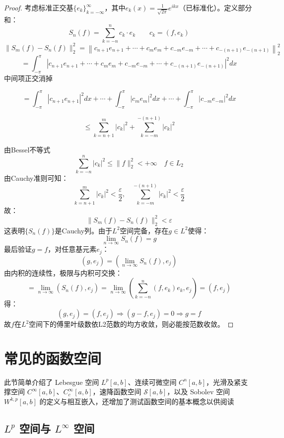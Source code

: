 \documentclass[linespread=1.5,openany]{book}%
\theoremstyle{plain}
\begin{document}
{{{{{{{{\begin{proof}
											考虑标准正交基$\{e_k\}_{k=-\infty}^\infty$，其中$e_k(x) = \frac{1}{\sqrt{2\pi}}e^{ikx}$（已标准化）。定义部分和：
											\[	S_n(f) = \sum_{k=-n}^n c_k \cdot e_k \quad \quad c_k = (f, e_k)\]
											\[	\| S_m(f) - S_n(f) \|_2^2 = \left\| c_{n+1} e_{n+1} + \cdots + c_m e_m + c_{-m} e_{-m} + \cdots + c_{-(n+1)} e_{-(n+1)} \right\|_2^2\]
											\[
											= \int_{-\pi}^\pi \left| c_{n+1} e_{n+1} + \cdots + c_m e_m + c_{-m} e_{-m} + \cdots + c_{-(n+1)} e_{-(n+1)} \right|^2 dx
											\]
											中间项正交消掉
											
											\[
											= \int_{-\pi}^\pi |c_{n+1} e_{n+1}|^2 dx + \cdots + \int_{-\pi}^\pi |c_m e_m|^2 dx + \cdots + \int_{-\pi}^\pi |c_{-m} e_{-m}|^2 dx
											\]
											
											\[
											\leq \sum_{k=n+1}^m  |c_k|^2 + \sum_{k=-m}^{-(n+1)} |c_k|^2
											\]
											
											由Bessel不等式
											\[
											\sum_{k=-n}^n |c_k|^2 \leq \|f\|_2^2 < +\infty \quad f \in L_2
											\]
											由Cauchy准则可知：
											\[
											\sum_{k=n+1}^m |c_k|^2 < \frac{\varepsilon}{2}, \quad \sum_{k=-m}^{-(n+1)} |c_k|^2 < \frac{\varepsilon}{2}
											\]
											故：
											\[\| S_m(f) - S_n(f) \|_2^2 < \varepsilon \]
											这表明$\{S_n(f)\}$是Cauchy列。由于$L^2$空间完备，存在$g \in L^2$使得：
											\[\lim_{n \to \infty} S_n(f) = g\]
											最后验证$g = f$，对任意基元素$e_j$：
											\[(g, e_j) = \left( \lim_{n \to \infty} S_n(f), e_j \right)\]
											由内积的连续性，极限与内积可交换：
											\[= \lim_{n \to \infty} (S_n(f), e_j) = \lim_{n \to \infty} \left( \sum_{k=-n}^n (f, e_k) e_k, e_j \right) = (f, e_j)
											\]
											得：
											\[
											(g, e_j) = (f, e_j) \Rightarrow (g - f, e_j) = 0 \Rightarrow g = f
											\]
											故$f$在$L^2$空间下的傅里叶级数依L2范数的均方收敛，则必能按范数收敛。
									\end{proof}}\newpage
									\section{常见的函数空间}
									{
										此节简单介绍了 Lebesgue 空间 $L^p[a,b]$、连续可微空间 $C^n[a,b]$，光滑及紧支撑空间 $C^\infty[a,b]$、$C_c^\infty[a,b]$，速降函数空间 $\mathcal S[a,b]$，以及 Sobolev 空间 $W^{k,p}[a,b]$ 的定义与相互嵌入，还增加了测试函数空间的基本概念以供阅读
										\subsection{\texorpdfstring{$L^p$}{Lp} 空间与 \texorpdfstring{$L^\infty$}{L∞} 空间}
										
}}}}}}}}
\end{document}
